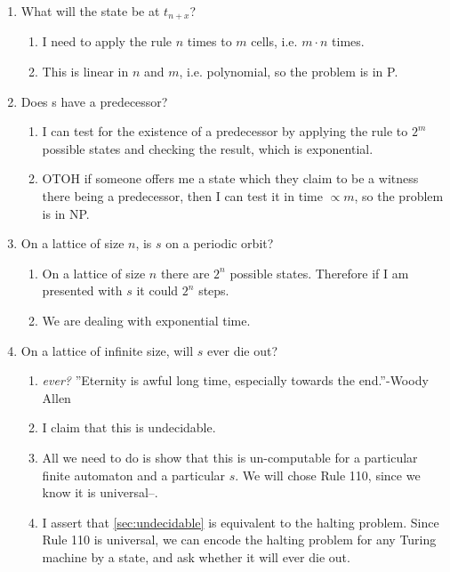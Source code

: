 \documentclass[]{article}
\begin{document}
\begin{enumerate}
	\item What will the state be at $t_{n+x}$?
	\begin{enumerate}
		\item I need to apply the rule $n$ times to $m$ cells, i.e. $m \cdot n$ times. \item This is linear in $n$ and $m$, i.e. polynomial, so the problem is in P. 
	\end{enumerate}
	\item Does s have a predecessor?
	\begin{enumerate}
		\item I can test for the existence of a predecessor by applying the rule to $2^m$ possible states and checking the result, which is exponential.
		\item OTOH if someone offers me a state which they claim to be a witness there being a predecessor, then I can test it in time $\propto m$, so the problem is in NP. 
	\end{enumerate}
	\item On a lattice of size $n$, is $s$ on a periodic orbit?
		\begin{enumerate}
			\item On a lattice of size $n$ there are $2^n$ possible states. Therefore if I am presented with $s$ it could  $2^n$ steps.
			\item We are dealing with exponential time. 
		\end{enumerate}
	\item On a lattice of infinite size, will $s$ ever die out?
		\begin{enumerate}
		\item \emph{ever?} ''Eternity is awful long time, especially towards the end.''-Woody Allen
		\item I claim that this is undecidable\label{sec:undecidable}.
		\item All we need to do is show that this is un-computable for a particular finite automaton and a particular $s$. We will chose Rule 110, since we know it is universal--\cite{cook2004universality}.
		\item  I assert that \ref{sec:undecidable} is equivalent to the halting problem. Since Rule 110 is universal, we can encode the halting problem for any Turing machine by a state, and ask whether it will ever die out. 
	\end{enumerate}
	
\end{enumerate}




\end{document}
